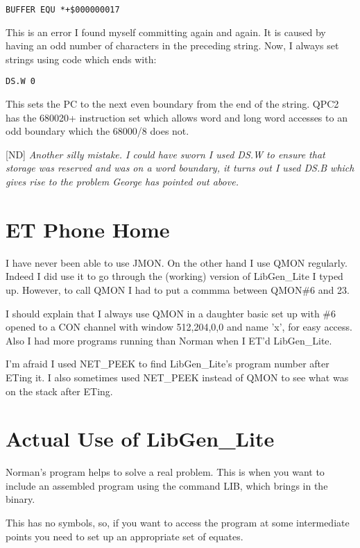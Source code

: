 \begin{lstlisting}[frame=none,numbers=none]
BUFFER EQU *+$000000017
\end{lstlisting}

This is an error I found myself committing again and again. It is caused by having an odd number of characters in the preceding string. Now, I always set strings using code which ends with:

\begin{lstlisting}[frame=none,numbers=none]
DS.W 0
\end{lstlisting}

This sets the PC to the next even boundary from the end of the string.
QPC2 has the 680020+ instruction set which allows word and long word accesses to an odd boundary which the 68000/8 does not.

[ND] \emph{Another silly mistake. I could have sworn I used DS.W to ensure that storage was reserved and was on a word boundary, it turns out I used DS.B which gives rise to the problem George has pointed out above.}

\section{ET Phone Home}
I have never been able to use JMON. On the other hand I use QMON regularly. Indeed I did use it to go through the (working) version of LibGen\_Lite I typed up. However, to call QMON I had to put a commma between QMON\#6 and 23.

I should explain that I always use QMON in a daughter basic set up with \#6 opened to a CON channel with window 512,204,0,0 and name 'x', for easy access. Also I had more programs running than Norman when I ET'd LibGen\_Lite.

I'm afraid I used NET\_PEEK to find LibGen\_Lite's program number after ETing it. I also sometimes used NET\_PEEK instead of QMON to see what was on the stack after ETing.

\section{Actual Use of LibGen\_Lite}
Norman's program helps to solve a real problem. This is when you want to include an assembled program using the command LIB, which brings in the binary.

This has no symbols, so, if you want to access the program at some intermediate points you need to set up an appropriate set of equates.


